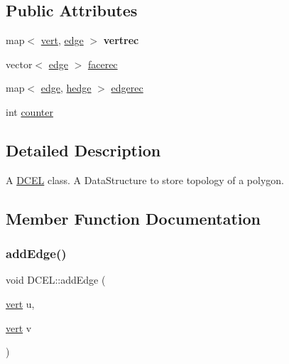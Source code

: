 \subsection*{Public Attributes}
\begin{DoxyCompactItemize}
\item 
\mbox{\label{class_d_c_e_l_a7c9ae7601c01ee464ffddf159597cd69}} 
map$<$ \hyperlink{_polygon_triangulation_8h_a15bccd83c1e570e4a0ff17c42152989b}{vert}, \hyperlink{_polygon_triangulation_8h_a4ef43ff5c6d42dacbc8ffd9c8cfdc189}{edge} $>$ {\bfseries vertrec}
\item 
vector$<$ \hyperlink{_polygon_triangulation_8h_a4ef43ff5c6d42dacbc8ffd9c8cfdc189}{edge} $>$ \hyperlink{class_d_c_e_l_ad1c616dc2bbcf2682aa58c8da5bd3aae}{facerec}
\item 
map$<$ \hyperlink{_polygon_triangulation_8h_a4ef43ff5c6d42dacbc8ffd9c8cfdc189}{edge}, \hyperlink{struct_half_edge}{hedge} $>$ \hyperlink{class_d_c_e_l_a88539db1a22065c15bc95f00e10ad693}{edgerec}
\item 
int \hyperlink{class_d_c_e_l_ab9bc9e59888b0dd878590eb146671bb0}{counter}
\end{DoxyCompactItemize}


\subsection{Detailed Description}
A \hyperlink{class_d_c_e_l}{D\+C\+EL} class. A Data\+Structure to store topology of a polygon. 

\subsection{Member Function Documentation}
\mbox{\label{class_d_c_e_l_aed8e7593ec708470baff3e6c9da353ff}} 
\subsubsection{\texorpdfstring{add\+Edge()}{addEdge()}}
{\footnotesize\ttfamily void D\+C\+E\+L\+::add\+Edge (\begin{DoxyParamCaption}\item[{\hyperlink{_polygon_triangulation_8h_a15bccd83c1e570e4a0ff17c42152989b}{vert}}]{u,  }\item[{\hyperlink{_polygon_triangulation_8h_a15bccd83c1e570e4a0ff17c42152989b}{vert}}]{v }\end{DoxyParamCaption})\hspace{0.3cm}{\ttfamily [inline]}}



